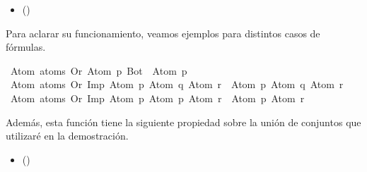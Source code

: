 \begin{isabellebody}
\begin{isamarkuptext}
 \begin{itemize}
  \item[]  \hfill ()
  \end{itemize}

Para aclarar su funcionamiento, veamos ejemplos para distintos casos de fórmulas.%
\end{isamarkuptext}\isamarkuptrue%
\isamarkupfalse%
\ {\isachardoublequoteopen}Atom\ {\isacharbackquote}atoms\ {\isacharparenleft}Or\ {\isacharparenleft}Atom\ p{\isacharparenright}\ Bot{\isacharparenright}\ {\isacharequal}\ {\isacharbraceleft}Atom\ p{\isacharbraceright}{\isachardoublequoteclose}\isanewline
\isanewline
{}\isamarkupfalse%
\ {\isachardoublequoteopen}Atom\ {\isacharbackquote}atoms\ {\isacharparenleft}Or\ {\isacharparenleft}Imp\ {\isacharparenleft}Atom\ p{\isacharparenright}\ {\isacharparenleft}Atom\ q{\isacharparenright}{\isacharparenright}\ {\isacharparenleft}Atom\ r{\isacharparenright}{\isacharparenright}\ {\isacharequal}\ {\isacharbraceleft}Atom\ p{\isacharcomma}\ Atom\ q{\isacharcomma}\ Atom\ r{\isacharbraceright}{\isachardoublequoteclose}\isanewline
\ %
\isadelimproof
%
\endisadelimproof
%
\isatagproof
%
\endisatagproof
{\isafoldproof}%
%
\isadelimproof
%
\endisadelimproof
\isanewline
{}\isamarkupfalse%
\ {\isachardoublequoteopen}Atom\ {\isacharbackquote}atoms\ {\isacharparenleft}Or\ {\isacharparenleft}Imp\ {\isacharparenleft}Atom\ p{\isacharparenright}\ {\isacharparenleft}Atom\ p{\isacharparenright}{\isacharparenright}\ {\isacharparenleft}Atom\ r{\isacharparenright}{\isacharparenright}\ {\isacharequal}\ {\isacharbraceleft}Atom\ p{\isacharcomma}\ Atom\ r{\isacharbraceright}{\isachardoublequoteclose}\isanewline
\ %
\isadelimproof
%
\endisadelimproof
%
\isatagproof
%
\endisatagproof
{\isafoldproof}%
%
\isadelimproof
%
\endisadelimproof
%
\begin{isamarkuptext}%
Además, esta función tiene la siguiente propiedad sobre la unión de conjuntos que utilizaré
en la demostración.\\
 \begin{itemize}
  \item[]  \hfill ()

\end{itemize}
\end{isamarkuptext}
\end{isabellebody}
